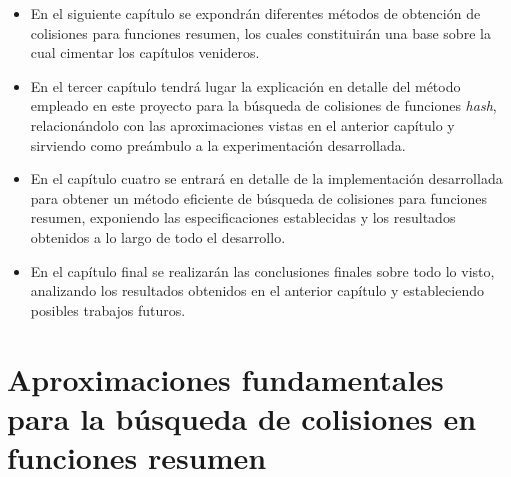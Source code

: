 \documentclass[12pt,spanish,listoffigures,listoftables,listofalgorithms]{tfgetsinf}
\newcommand{\hash}{\textit{hash}}
\begin{document}
\begin{itemize}

	\item En el siguiente capítulo se expondrán diferentes métodos de obtención de colisiones para funciones resumen, los cuales constituirán una base sobre la cual cimentar los capítulos venideros.

	\item En el tercer capítulo tendrá lugar la explicación en detalle del método empleado en este proyecto para la búsqueda de colisiones de funciones \hash, relacionándolo con las aproximaciones vistas en el anterior capítulo y sirviendo como preámbulo a la experimentación desarrollada.

	\item En el capítulo cuatro se entrará en detalle de la implementación desarrollada para obtener un método eficiente de búsqueda de colisiones para funciones resumen, exponiendo las especificaciones establecidas y los resultados obtenidos a lo largo de todo el desarrollo.

	\item En el capítulo final se realizarán las conclusiones finales sobre todo lo visto, analizando los resultados obtenidos en el anterior capítulo y estableciendo posibles trabajos futuros.

\end{itemize}

%


\chapter{Aproximaciones fundamentales para la búsqueda de colisiones en funciones resumen}
\end{document}
